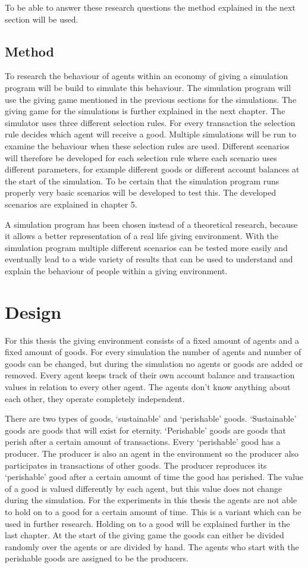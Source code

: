 \documentclass[twoside,openright]{uva-bachelor-thesis}
\begin{document}
To be able to answer these research questions the method explained in the next section will be used.

\section{Method}
To research the behaviour of agents within an economy of giving a simulation program will be build to simulate this behaviour. The simulation program will use the giving game mentioned in the previous sections for the simulations. The giving game for the simulations is further explained in the next chapter. The simulator uses three different selection rules. For every transaction the selection rule decides which agent will receive a good. Multiple simulations will be run to examine the behaviour when these selection rules are used. Different scenarios will therefore be developed for each selection rule where each scenario uses different parameters, for example different goods or different account balances at the start of the simulation. To be certain that the simulation program runs properly very basic scenarios will be developed to test this. The developed scenarios are explained in chapter 5. 

A simulation program has been chosen instead of a theoretical research, because it allows a better representation of a real life giving environment. With the simulation program multiple different scenarios can be tested more easily and eventually lead to a wide variety of results that can be used to understand and explain the behaviour of people within a giving environment.


\chapter{Design}
For this thesis the giving environment consists of a fixed amount of agents and a fixed amount of goods. For every simulation the number of agents and number of goods can be changed, but during the simulation no agents or goods are added or removed. Every agent keeps track of their own account balance and transaction values in relation to every other agent. The agents don’t know anything about each other, they operate completely independent.

There are two types of goods, ‘sustainable’ and ‘perishable’ goods. ‘Sustainable’ goods are goods that will exist for eternity. ‘Perishable’ goods are goods that perish after a certain amount of transactions. Every ‘perishable’ good has a producer. The producer is also an agent in the environment so the producer also participates in transactions of other goods. The producer reproduces its ‘perishable’ good after a certain amount of time the good has perished. The value of a good is valued differently by each agent, but this value does not change during the simulation. For the experiments in this thesis the agents are not able to hold on to a good for a certain amount of time. This is a variant which can be used in further research. Holding on to a good will be explained further in the last chapter. At the start of the giving game the goods can either be divided randomly over the agents or are divided by hand. The agents who start with the perishable goods are assigned to be the producers.
\end{document}
